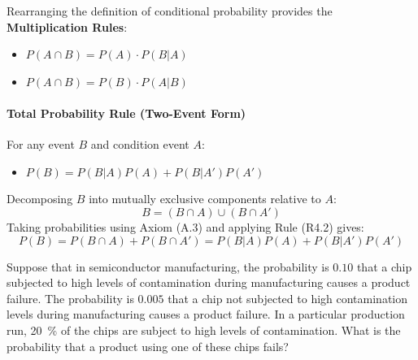 Rearranging the definition of conditional probability provides the \textbf{Multiplication Rules}:
\begin{itemize}\setlength\itemsep{1em}
    \item[\textbf{(R4.1)}] $P(A \cap B) = P(A) \cdot P(B|A)$
    \item[\textbf{(R4.2)}] $P(A \cap B) = P(B) \cdot P(A|B)$
\end{itemize}

\paragraph{Total Probability Rule (Two-Event Form)}
For any event $B$ and condition event $A$:
\begin{itemize}
    \item[\textbf{(R5)}] $P(B) = P(B|A)P(A) + P(B|A')P(A')$
\end{itemize}

\begin{proofbox}[(R5)]
    Decomposing $B$ into mutually exclusive components relative to $A$:
    \[
        B = (B \cap A) \cup (B \cap A')
    \]
    Taking probabilities using Axiom (A.3) and applying Rule (R4.2) gives:
    \[
        P(B) = P(B \cap A) + P(B \cap A') = P(B|A)P(A) + P(B|A')P(A')
    \]
\end{proofbox}

\begin{example}
    Suppose that in semiconductor manufacturing, the probability is $0.10$ that a chip subjected to high levels of contamination during manufacturing causes a product failure.
    The probability is $0.005$ that a chip not subjected to high contamination levels during manufacturing causes a product failure.
    In a particular production run, \SI{20}{\percent} of the chips are subject to high levels of contamination.
    What is the probability that a product using one of these chips fails?
\end{example}

